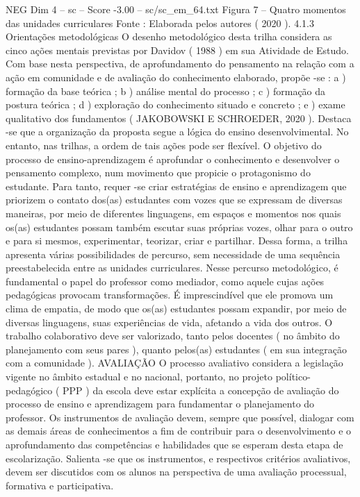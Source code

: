 \begin{textsample}{NEG Dim 4 – sc – Score -3.00 – sc/sc\_em\_64.txt}
Figura 7 – Quatro momentos das unidades curriculares Fonte : Elaborada pelos autores ( 2020 ). 4.1.3 Orientações metodológicas O desenho metodológico desta trilha considera as cinco ações mentais previstas por Davidov ( 1988 ) em sua Atividade de Estudo.
Com base nesta perspectiva, de aprofundamento do pensamento na relação com a ação em comunidade e de avaliação do conhecimento elaborado, propõe -se : a ) formação da base teórica ; b ) análise mental do processo ; c ) formação da postura teórica ; d ) exploração do conhecimento situado e concreto ; e ) exame qualitativo dos fundamentos ( JAKOBOWSKI E SCHROEDER, 2020 ).
Destaca -se que a organização da proposta segue a lógica do ensino desenvolvimental.
No entanto, nas trilhas, a ordem de tais ações pode ser flexível.
O objetivo do processo de ensino-aprendizagem é aprofundar o conhecimento e desenvolver o pensamento complexo, num movimento que propicie o protagonismo do estudante.
Para tanto, requer -se criar estratégias de ensino e aprendizagem que priorizem o contato dos(as) estudantes com vozes que se expressam de diversas maneiras, por meio de diferentes linguagens, em espaços e momentos nos quais os(as) estudantes possam também escutar suas próprias vozes, olhar para o outro e para si mesmos, experimentar, teorizar, criar e partilhar.
Dessa forma, a trilha apresenta várias possibilidades de percurso, sem necessidade de uma sequência preestabelecida entre as unidades curriculares.
Nesse percurso metodológico, é fundamental o papel do professor como mediador, como aquele cujas ações pedagógicas provocam transformações.
É imprescindível que ele promova um clima de empatia, de modo que os(as) estudantes possam expandir, por meio de diversas linguagens, suas experiências de vida, afetando a vida dos outros.
O trabalho colaborativo deve ser valorizado, tanto pelos docentes ( no âmbito do planejamento com seus pares ), quanto pelos(as) estudantes ( em sua integração com a comunidade ).
AVALIAÇÃO O processo avaliativo considera a legislação vigente no âmbito estadual e no nacional, portanto, no projeto político-pedagógico ( PPP ) da escola deve estar explícita a concepção de avaliação do processo de ensino e aprendizagem para fundamentar o planejamento do professor.
Os instrumentos de avaliação devem, sempre que possível, dialogar com as demais áreas de conhecimentos a fim de contribuir para o desenvolvimento e o aprofundamento das competências e habilidades que se esperam desta etapa de escolarização.
Salienta -se que os instrumentos, e respectivos critérios avaliativos, devem ser discutidos com os alunos na perspectiva de uma avaliação processual, formativa e participativa.

\end{textsample}
